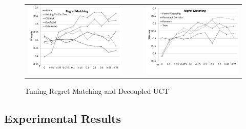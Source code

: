 \documentclass[conference]{IEEEtran}
\begin{document}
\begin{figure}[t!]
\begin{tabular}{ccc}
\hspace{-0.8cm}\includegraphics[scale=0.3]{figures/regretmatching1} & ~~~ & \includegraphics[scale=0.3]{figures/regretmatching2}\\
\end{tabular}
\caption{Tuning Regret Matching and Decoupled UCT}
\label{fig:tuning1}
\end{figure}


\subsection{Experimental Results}
\label{subsec:results}

\end{document}
